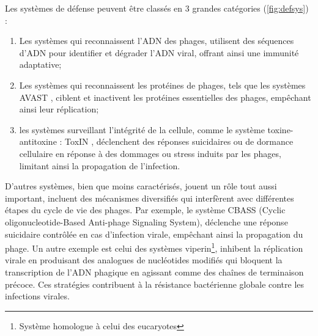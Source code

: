 Les systèmes de défense peuvent être classés en 3 grandes catégories (\autoref{fig:defsys}) :
\begin{enumerate}[label=(\roman*)]
    \item Les systèmes qui reconnaissent l'ADN des phages, utilisent des séquences d'ADN pour identifier et dégrader l'ADN viral, offrant ainsi une immunité adaptative;
    \item Les systèmes qui reconnaissent les protéines de phages, tels que les systèmes AVAST \cite{gao_diverse_2020}, ciblent et inactivent les protéines essentielles des phages, empêchant ainsi leur réplication;
    \item les systèmes surveillant l'intégrité de la cellule, comme le système toxine-antitoxine : ToxIN \cite{guegler_shutoff_2021}, déclenchent des réponses suicidaires ou de dormance cellulaire en réponse à des dommages ou stress induits par les phages, limitant ainsi la propagation de l'infection.
\end{enumerate}

D’autres systèmes, bien que moins caractérisés, jouent un rôle tout aussi important, incluent des mécanismes diversifiés qui interfèrent avec différentes étapes du cycle de vie des phages. Par exemple, le système CBASS (Cyclic oligonucleotide-Based Anti-phage Signaling System), déclenche une réponse suicidaire contrôlée en cas d'infection virale, empêchant ainsi la propagation du phage. Un autre exemple est celui des systèmes viperin\footnote{Système homologue à celui des eucaryotes}, inhibent la réplication virale en produisant des analogues de nucléotides modifiés qui bloquent la transcription de l'ADN phagique en agissant comme des chaînes de terminaison précoce. Ces stratégies contribuent à la résistance bactérienne globale contre les infections virales.

